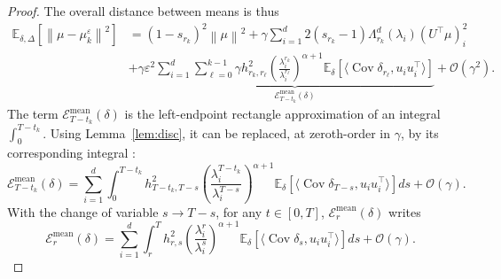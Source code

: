 \documentclass[11pt]{article}
\newcommand{\norm}[1]{\left\|{#1}\right\|}
\newcommand{\EE}{\mathbb{E}}
\newcommand{\cov}{\operatorname{Cov}}
\newcommand{\diag}[1]{\operatorname{Diag}\left({#1}\right)}
\begin{document}
\begin{proof}
The overall distance between means is thus 
\begin{equation} \label{eq:L2_means}
\begin{split}
    \EE_{\delta, \Delta} \left[\norm{\mu - \mu_k^\varepsilon }^2\right]  
    &= (1- s_{r_k})^2\norm{\mu}^2  + \gamma \sum_{i=1}^d 2 (s_{r_k}-1) \Lambda^{d}_{r_k}(\lambda_i)(U^\top \mu)^2_i  \\
    &+ \gamma \varepsilon^2 \underbrace{\sum_{i=1}^d \sum_{\ell=0}^{k-1} \gamma h_{r_k,r_\ell}^2 \left(\frac{\lambda_i^{r_k}}{\lambda_i^{r_\ell}}\right)^{\alpha+1} \EE_{\delta} \left[\langle \cov \delta_{r_\ell}, u_i u_i^\top \rangle\right]}_{\mathcal{E}_{T-t_k}^{\text{mean}}(\delta)} + \mathcal{O}(\gamma^2).
\end{split}
\end{equation}
The term $\mathcal{E}_{T-t_k}^{\text{mean}}(\delta)$ is the left-endpoint rectangle approximation of an integral $\int_0^{T-t_k}$. Using Lemma~\ref{lem:disc}, it can be replaced, at zeroth-order in $\gamma$,  by its corresponding integral : 
\begin{equation*} 
\mathcal{E}_{T-t_k}^{\text{mean}}(\delta) = \sum_{i=1}^d \int_0^{T-t_k} h_{T-t_k,T-s}^2 \left(\frac{\lambda_i^{T-t_k}}{\lambda_i^{T-s}}\right)^{\alpha+1} \EE_{\delta} \left[\langle \cov \delta_{T-s}, u_i u_i^\top \rangle\right]ds + \mathcal{O}(\gamma).
\end{equation*}
With the change of variable $s \to T-s$, for any $t \in [0,T]$, $\mathcal{E}_{r}^{\text{mean}}(\delta)$ writes
\begin{equation*} 
\mathcal{E}_{r}^{\text{mean}}(\delta) = \sum_{i=1}^d \int_r^{T} h_{r,s}^2 \left(\frac{\lambda_i^{r}}{\lambda_i^{s}}\right)^{\alpha+1} \EE_{\delta} \left[\langle \cov \delta_{s}, u_i u_i^\top \rangle\right]ds + \mathcal{O}(\gamma).
\end{equation*}


\end{proof}
\end{document}
